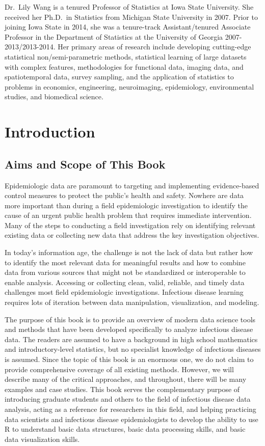 \documentclass[]{book}
\begin{document}
Dr.~Lily Wang is a tenured Professor of Statistics at Iowa State
University. She received her Ph.D.~in Statistics from Michigan State
University in 2007. Prior to joining Iowa State in 2014, she was a
tenure-track Assistant/tenured Associate Professor in the Department of
Statistics at the University of Georgia 2007-2013/2013-2014. Her primary
areas of research include developing cutting-edge statistical
non/semi-parametric methods, statistical learning of large datasets with
complex features, methodologies for functional data, imaging data, and
spatiotemporal data, survey sampling, and the application of statistics
to problems in economics, engineering, neuroimaging, epidemiology,
environmental studies, and biomedical science.

\chapter{Introduction}\label{intro}

\section{Aims and Scope of This Book}\label{aims-and-scope-of-this-book}

Epidemiologic data are paramount to targeting and implementing
evidence-based control measures to protect the public's health and
safety. Nowhere are data more important than during a field
epidemiologic investigation to identify the cause of an urgent public
health problem that requires immediate intervention. Many of the steps
to conducting a field investigation rely on identifying relevant
existing data or collecting new data that address the key investigation
objectives.

In today's information age, the challenge is not the lack of data but
rather how to identify the most relevant data for meaningful results and
how to combine data from various sources that might not be standardized
or interoperable to enable analysis. Accessing or collecting clean,
valid, reliable, and timely data challenges most field epidemiologic
investigations. Infectious disease learning requires lots of iteration
between data manipulation, visualization, and modeling.

The purpose of this book is to provide an overview of modern data
science tools and methods that have been developed specifically to
analyze infectious disease data. The readers are assumed to have a
background in high school mathematics and introductory-level statistics,
but no specialist knowledge of infectious diseases is assumed. Since the
topic of this book is an enormous one, we do not claim to provide
comprehensive coverage of all existing methods. However, we will
describe many of the critical approaches, and throughout, there will be
many examples and case studies. This book serves the complementary
purpose of introducing graduate students and others to the field of
infectious disease data analysis, acting as a reference for researchers
in this field, and helping practicing data scientists and infectious
disease epidemiologists to develop the ability to use R to understand
basic data structures, basic data processing skills, and basic data
visualization skills.
\end{document}
